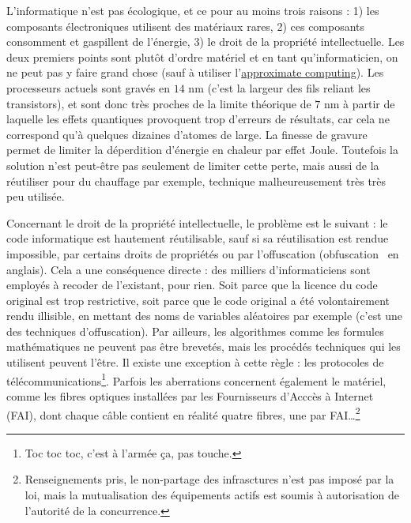 \documentclass[10pt]{article}
\begin{document}
L'informatique n'est pas écologique, et ce pour au moins trois raisons : 1) les composants électroniques utilisent des matériaux rares,
2) ces composants consomment et gaspillent de l'énergie, 3) le droit de la propriété intellectuelle.
Les deux premiers points sont plutôt d'ordre matériel et en tant qu'informaticien, on ne peut pas y faire grand chose (sauf à utiliser
l'\href{https://en.wikipedia.org/wiki/Approximate_computing}{approximate computing}).
Les processeurs actuels sont gravés en $14$ nm (c'est la largeur des fils reliant les transistors), et sont donc très proches
de la limite théorique de $7$ nm à partir de laquelle les effets quantiques provoquent trop d'erreurs de résultats, car cela ne correspond
qu'à quelques dizaines d'atomes de large. La finesse de gravure permet
de limiter la déperdition d'énergie en chaleur par effet Joule. Toutefois la solution n'est peut-être pas seulement de limiter cette perte,
mais aussi de la réutiliser pour du chauffage par exemple, technique malheureusement très très peu utilisée.


Concernant le droit de la propriété intellectuelle, le problème est le suivant : le code informatique est hautement réutilisable,
sauf si sa réutilisation est rendue impossible, par certains droits de propriétés ou par l'offuscation (\og obfuscation \fg~en anglais).
Cela a une conséquence directe : des milliers d'informaticiens sont employés à recoder de l'existant, pour rien. Soit parce que la
licence du code original est trop restrictive, soit parce que le code original a été volontairement rendu illisible, en mettant
des noms de variables aléatoires par exemple (c'est une des techniques d'offuscation). Par ailleurs, les algorithmes comme
les formules mathématiques ne peuvent pas être brevetés, mais les procédés techniques qui les utilisent peuvent l'être. Il existe
une exception à cette règle : les protocoles de télécommunications\footnote{Toc toc toc, c'est à l'armée ça, pas touche.}.
Parfois les aberrations concernent également le matériel, comme les fibres optiques installées par les Fournisseurs
d'Acccès à Internet (FAI), dont chaque câble contient en réalité quatre fibres, une par FAI\ldots \footnote{
  Renseignements pris, le non-partage des infrasctures n'est pas imposé par la loi, mais la mutualisation des équipements
  actifs est soumis à autorisation de l'autorité de la concurrence.
}
\end{document}
